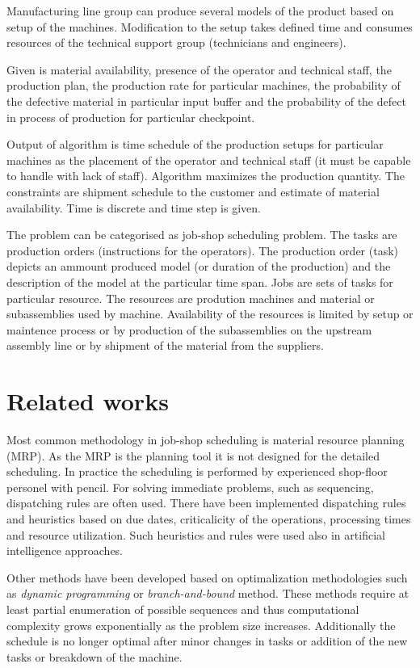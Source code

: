 \documentclass[a4paper,journal,twocolumn]{IEEEtran}
\begin{document}
Manufacturing line group can produce several models of the product based on setup of the 
machines. Modification to the setup takes defined time and consumes resources of the
technical support group (technicians and engineers).

Given is material availability, presence of the operator and technical staff, the production plan,
the production rate for particular machines, the probability of the defective material in 
particular input buffer and the probability of the defect in process of production for particular
checkpoint.

Output of algorithm is time schedule of the production setups for particular machines as the 
placement of the operator and technical staff (it must be capable to handle with lack of staff).
Algorithm maximizes the production quantity. The constraints are shipment schedule to
the customer and estimate of material availability. Time is discrete and time step is given.


The problem can be categorised as job-shop scheduling problem. The tasks are production orders (instructions for the operators).
The production order (task) depicts an ammount produced model (or duration of the production) and the description of the model
at the particular time span.
Jobs are sets of tasks for particular resource.
The resources are prodution machines and material or subassemblies used by machine.
Availability of the resources is limited by setup or maintence process or by production of the subassemblies
on the upstream assembly line or by shipment of the material from the suppliers.

\section{Related works}
Most common methodology in job-shop scheduling is material resource planning (MRP). As the MRP is the planning tool it
is not designed for the detailed scheduling. In practice the scheduling is performed by experienced shop-floor
personel with pencil. 
For solving immediate problems, such as sequencing, dispatching rules are often used. 
There have been implemented dispatching rules and heuristics  based on  due dates, criticalicity of the operations, 
processing times and resource utilization. 
Such heuristics and rules were used also in artificial intelligence approaches.\cite{Hoi}

Other methods have been developed based on optimalization methodologies such as \emph{dynamic programming} or 
\emph{branch-and-bound} method.
These methods require at least partial enumeration of possible sequences and thus computational complexity grows exponentially
as the problem size increases. Additionally the schedule is no longer optimal after minor changes in tasks or addition of the 
new tasks or breakdown of the machine.\cite{Hoi}
\end{document}
